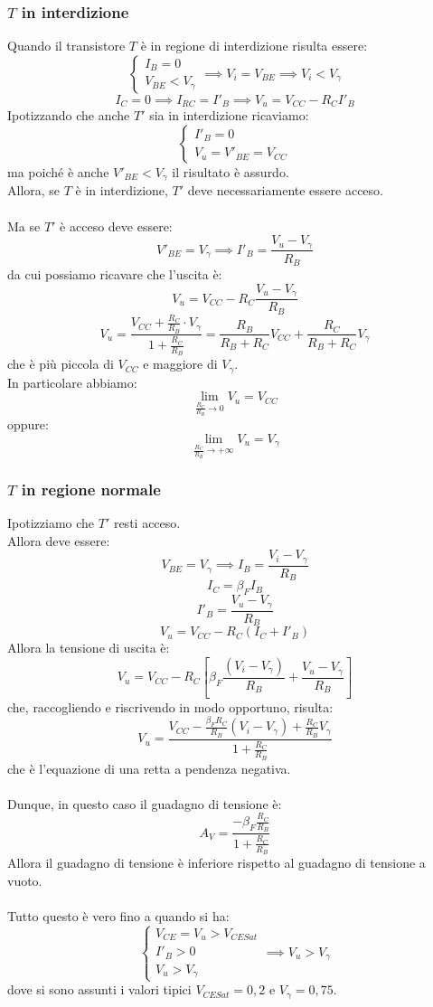 \documentclass[../main.tex]{subfiles}
\begin{document}
	\subsubsection{$T$ in interdizione}
	Quando il transistore $T$ è in regione di interdizione risulta essere:
	\[ \begin{cases} I_B = 0 \\ V_{BE} < V_\gamma \end{cases} \implies V_i = V_{BE} \implies V_i < V_\gamma \]
	\[ I_C = 0 \implies I_{RC} = I'_B \implies V_u = V_{CC} - R_C I'_B \]
	Ipotizzando che anche $T'$ sia in interdizione ricaviamo:
	\[ \begin{cases} I'_B = 0 \\ V_u = V'_{BE} = V_{CC} \end{cases} \]
	ma poiché è anche $V'_{BE} < V_\gamma$ il risultato è assurdo.\\
	Allora, se $T$ è in interdizione, $T'$ deve necessariamente essere acceso.\\\\
	Ma se $T'$ è acceso deve essere:
	\[ V'_{BE} = V_\gamma \implies I'_B = \frac{V_u - V_\gamma}{R_B} \]
	da cui possiamo ricavare che l'uscita è:
	\[ V_u = V_{CC} - R_C \frac{V_u - V_\gamma}{R_B} \]
	\[ V_u = \frac{V_{CC} + \frac{R_C}{R_B} \cdot V_\gamma}{1 + \frac{R_C}{R_B}} = \frac{R_B}{R_B + R_C} V_{CC} + \frac{R_C}{R_B + R_C} V_\gamma \]
	che è più piccola di $V_{CC}$ e maggiore di $V_\gamma$.\\
	In particolare abbiamo:
	\[ \lim_{\frac{R_C}{R_B} \rightarrow 0} V_u = V_{CC} \]
	oppure:
	\[ \lim_{\frac{R_C}{R_B} \rightarrow +\infty} V_u = V_\gamma \]
	\subsubsection{$T$ in regione normale}
	Ipotizziamo che $T'$ resti acceso.\\
	Allora deve essere:
	\[ V_{BE} = V_\gamma \implies I_B = \frac{V_i - V_\gamma}{R_B} \]
	\[ I_C = \beta_F I_B \]
	\[ I'_B = \frac{V_u - V_\gamma}{R_B} \]
	\[ V_u = V_{CC} - R_C \left(I_C + I'_B\right) \]
	Allora la tensione di uscita è:
	\[ V_u = V_{CC} - R_C \left[ \beta_F \frac{(V_i - V_\gamma)}{R_B} + \frac{V_u - V_\gamma}{R_B} \right] \]
	che, raccogliendo e riscrivendo in modo opportuno, risulta:
	\[ V_u = \frac{V_{CC} - \frac{\beta_F R_C}{R_B} (V_i - V_\gamma) + \frac{R_C}{R_B} V_\gamma}{1 + \frac{R_C}{R_B}} \]
	che è l'equazione di una retta a pendenza negativa.\\\\
	Dunque, in questo caso il guadagno di tensione è:
	\[ A_V = \frac{-\beta_F \frac{R_C}{R_B}}{1 + \frac{R_C}{R_B}} \]
	Allora il guadagno di tensione è inferiore rispetto al guadagno di tensione a vuoto.\\\\
	Tutto questo è vero fino a quando si ha:
	\[ \begin{cases} V_{CE} = V_u > V_{CESat} \\ I'_B > 0 \\ V_u > V_\gamma \end{cases} \implies V_u > V_\gamma \]
	dove si sono assunti i valori tipici $V_{CESat} = 0,2$ e $V_\gamma = 0,75$.
\end{document}
